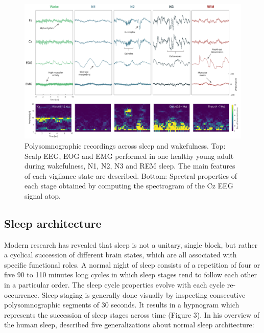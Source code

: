 \begin{figure}
	\centering
	\includegraphics[width=\linewidth, height=0.8\textheight, keepaspectratio]{Fig/Intro/Intro_Sleep_Stages_PSD/Fig_Intro_Sleep_Stages_PSD_final_150517.png}
	\captionsetup{width=0.9\textheight}
	\caption[Polysomnographic recordings across sleep and wakefulness]{Polysomnographic recordings across sleep and wakefulness. Top: Scalp EEG, EOG and EMG performed in one healthy young adult during wakefulness, N1, N2, N3 and REM sleep. The main features of each vigilance state are described. Bottom: Spectral properties of each stage obtained by computing the spectrogram of the Cz EEG signal atop.}
	\label{fig:intro:sleep_stage}
\end{figure}

\subsection{Sleep architecture}
\label{sec:dream-research:sleep:architecture}

Modern research has revealed that sleep is not a unitary, single block, but rather a cyclical succession of different brain states, which are all associated with specific functional roles. A normal night of sleep consists of a repetition of four or five 90 to 110 minutes long cycles in which sleep stages tend to follow each other in a particular order. The sleep cycle properties evolve with each cycle re-occurrence. Sleep staging is generally done visually by inspecting consecutive polysomnographic segments of 30 seconds. It results in a hypnogram which represents the succession of sleep stages across time (Figure 3). In his overview of the human sleep, \citet{hirshkowitz_normal_2004} described five generalizations about normal sleep architecture:

